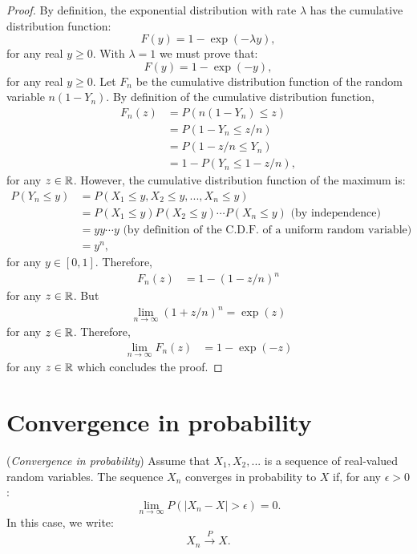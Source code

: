 \documentclass{article}
\begin{document}
\begin{proof}
By definition, the exponential distribution with rate $\lambda$ has the cumulative distribution function:
$$
F(y) = 1 - \exp(-\lambda y),
$$
for any real $y\geq 0$.
With $\lambda=1$ we must prove that:
$$
F(y) = 1 - \exp(-y),
$$
for any real $y\geq 0$. 
Let $F_n$ be the cumulative distribution function of the random variable $n(1-Y_n)$. 
By definition of the cumulative distribution function, 
\begin{align*}
F_n(z) 
&= P(n(1-Y_n)\leq z) \\
&= P(1-Y_n\leq z/n) \\
&= P(1-z/n\leq Y_n) \\
&= 1-P(Y_n\leq 1-z/n),
\end{align*}
for any $z\in\mathbb{R}$. 
However, the cumulative distribution function of the maximum is: 
\begin{align*}
P(Y_n\leq y)
& = P(X_1\leq y, X_2\leq y,..., X_n\leq y) \\
& = P(X_1\leq y)P(X_2\leq y) \cdots P(X_n\leq y) \textrm{ (by independence)}\\
& = y y \cdots y \textrm{ (by definition of the C.D.F. of a uniform random variable)}\\
& = y^n,
\end{align*}
for any $y\in[0,1]$. 
Therefore, 
\begin{align*}
F_n(z) 
&= 1-(1-z/n)^n
\end{align*}
for any $z\in\mathbb{R}$. 
But 
\begin{align*}
\lim_{n\rightarrow \infty} (1+z/n)^n = \exp(z)
\end{align*}
for any $z\in\mathbb{R}$. 
Therefore,
\begin{align*}
\lim_{n\rightarrow\infty} F_n(z) 
&= 1-\exp(-z)
\end{align*}
for any $z\in\mathbb{R}$ which concludes the proof.
\end{proof}


\section{Convergence in probability}

\begin{definition}
(\emph{Convergence in probability})
Assume that $X_1,X_2,...$ is a sequence of real-valued random variables. 
The sequence $X_n$ converges in probability to $X$ if, for any $\epsilon>0$:
$$
\lim_{n\rightarrow \infty} P(|X_n-X|>\epsilon)=0.
$$
In this case, we write:
$$
X_n \xrightarrow{P} X.
$$
\end{definition}
\end{document}
